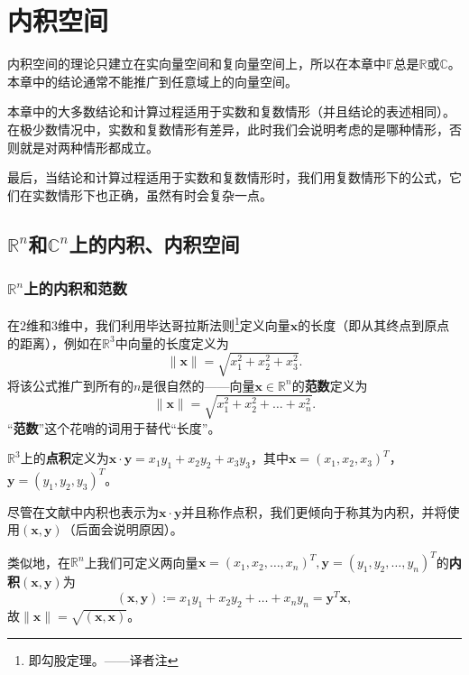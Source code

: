 
\chapter{内积空间}\label{chap:InnerProduct}

内积空间的理论只建立在实向量空间和复向量空间上，所以在本章中$\mathbb{F}$总是$\mathbb{R}$或$\mathbb{C}$。本章中的结论通常不能推广到任意域上的向量空间。

本章中的大多数结论和计算过程适用于实数和复数情形（并且结论的表述相同）。在极少数情况中，实数和复数情形有差异，此时我们会说明考虑的是哪种情形，否则就是对两种情形都成立。

最后，当结论和计算过程适用于实数和复数情形时，我们用复数情形下的公式，它们在实数情形下也正确，虽然有时会复杂一点。

\section{\texorpdfstring{$\mathbb{R}^n$}{R\^{}n}和\texorpdfstring{$\mathbb{C}^n$}{C\^{}n}上的内积、内积空间}

\subsection{\texorpdfstring{$\mathbb{R}^n$}{R\^{}n}上的内积和范数}

在$2$维和$3$维中，我们利用毕达哥拉斯法则\footnote{即勾股定理。——译者注}定义向量$\mathbf{x}$的长度（即从其终点到原点的距离），例如在$\mathbb{R}^3$中向量的长度定义为\[\|\mathbf{x}\|=\sqrt{x_1^2+x_2^2+x_3^2}.\]
将该公式推广到所有的$n$是很自然的——向量$\mathbf{x}\in\mathbb{R}^n$的\textbf{范数}定义为\[\|\mathbf{x}\|=\sqrt{x_1^2+x_2^2+\ldots+x_n^2}.\]
“\textbf{范数}”这个花哨的词用于替代“长度”。

$\mathbb{R}^3$上的\textbf{点积}定义为$\mathbf{x}\cdot\mathbf{y}=x_1y_1+x_2y_2+x_3y_3$，其中$\mathbf{x}=(x_1,x_2,x_3)^T$，$\mathbf{y}=(y_1,y_2,y_3)^T$。

\begin{remark*}
    尽管在文献中内积也表示为$\mathbf{x}\cdot\mathbf{y}$并且称作点积，我们更倾向于称其为内积，并将使用$(\mathbf{x},\mathbf{y})$（后面会说明原因）。
\end{remark*}
类似地，在$\mathbb{R}^n$上我们可定义两向量$\mathbf{x}=(x_{1},x_{2},\ldots,x_{n})^{T},\mathbf{y}=(y_{1},y_{2},\ldots,y_{n})^{T}$的\textbf{内积}$(\mathbf{x},\mathbf{y})$为\[(\mathbf{x},\mathbf{y}):=x_1y_1+x_2y_2+\ldots+x_ny_n=\mathbf{y}^T\mathbf{x},\]
故$\|\mathbf{x}\|=\sqrt{(\mathbf{x},\mathbf{x})}$。


